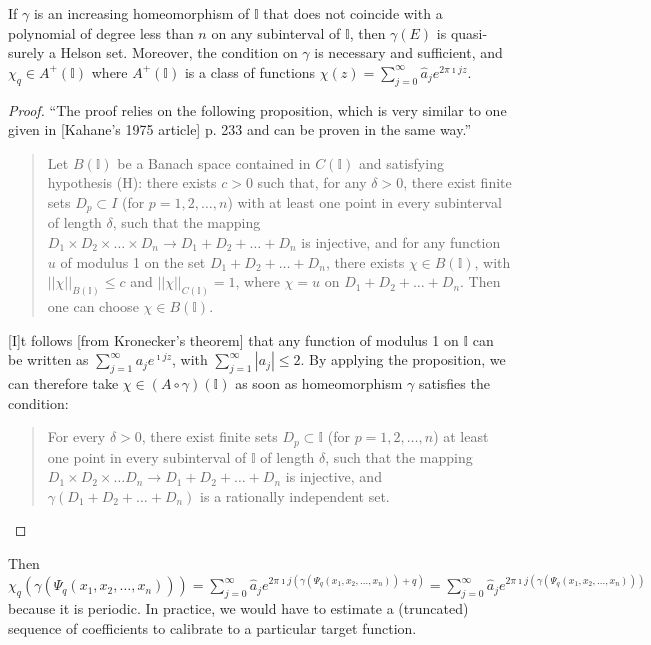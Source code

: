 \begin{proposition}
  \label{prop:Helson}
  If $\gamma$ is an increasing homeomorphism of $\mathbb{I}$ that does not coincide with a polynomial of degree less than $n$ on any subinterval of $\mathbb{I}$, then $\gamma\left(E\right)$ is quasi-surely a Helson set. Moreover, the condition on $\gamma$ is necessary and sufficient, and $\chi_q \in A^+\left(\mathbb{I}\right)$ where $A^+\left(\mathbb{I}\right)$ is a class of functions $\chi\left(z\right) = \sum\limits_{j = 0}^\infty \widehat{a}_j e^{2\pi \imath j z}$.
\end{proposition}
\begin{proof}
   ``The proof relies on the following proposition, which is very similar to one given in [Kahane's 1975 article] p. 233 and can be proven in the same way.'' 
   \begin{quote}
    Let $B\left(\mathbb{I}\right)$ be a Banach space contained in $C\left(\mathbb{I}\right)$ and satisfying hypothesis (H): there exists $c > 0$ such that, for any $\delta > 0$, there exist finite sets $D_p\subset I$ (for $p = 1, 2, \ldots, n$) with at least one point in every subinterval of length $\delta$, such that the mapping $D_1\times D_2\times \dots \times D_n \to D_1 + D_2 + \ldots + D_n$ is injective, and for any function $u$ of modulus 1 on the set $D_1 + D_2 + \ldots + D_n$, there exists $\chi\in B\left(\mathbb{I}\right)$, with $\left|\left|\chi\right|\right|_{B\left(\mathbb{I}\right)} \leq c$ and $\left|\left|\chi\right|\right|_{C\left(\mathbb{I}\right)} = 1$, where $\chi = u$ on $D_1 + D_2 + \ldots + D_n$. Then one can choose $\chi \in B\left(\mathbb{I}\right)$.
    \end{quote}
    [I]t follows [from Kronecker's theorem] that any function of modulus 1 on $\mathbb{I}$ can be written as $\sum\limits_{j = 1}^\infty a_j e^{\imath j z}$, with $\sum\limits_{j = 1}^\infty \left|a_j\right| \leq 2$. By applying the proposition, we can therefore take $\chi \in (A \circ \gamma)\left(\mathbb{I}\right)$ as soon as homeomorphism $\gamma$ satisfies the condition:
    \begin{quote}
    For every $\delta > 0$, there exist finite sets $D_p \subset \mathbb{I}$ (for $p = 1, 2, \ldots, n$) at least one point in every subinterval of $\mathbb{I}$ of length $\delta$, such that the mapping $D_1 \times D_2\times \ldots D_n \to D_1 + D_2 + \ldots + D_n$ is injective, and $\gamma(D_1 + D_2 + \ldots + D_n)$ is a rationally independent set.
   \end{quote}
\end{proof}

Then $\chi_q\left(\gamma\left(\Psi_q\left(x_1, x_2, \dots, x_n\right)\right)\right) = \sum\limits_{j = 0}^\infty \widehat{a}_j e^{2\pi \imath j \left(\gamma\left(\Psi_q\left(x_1, x_2, \dots, x_n\right)\right) + q\right)} = \sum\limits_{j = 0}^\infty \widehat{a}_j e^{2\pi \imath j \left(\gamma\left(\Psi_q\left(x_1, x_2, \dots, x_n\right)\right)\right)}$ because it is periodic. In practice, we would have to estimate a (truncated) sequence of coefficients to calibrate to a particular target function.
